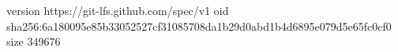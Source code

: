 version https://git-lfs.github.com/spec/v1
oid sha256:6a180095e85b33052527cf31085708da1b29d0abd1b4d6895e079d5e65fc0cf0
size 349676
